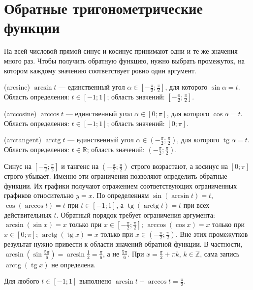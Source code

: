 \section{Обратные тригонометрические функции}
На всей числовой прямой синус и косинус принимают одни и те же значения много раз. Чтобы получить обратную функцию, нужно выбрать промежуток, на котором каждому значению соответствует ровно один аргумент.
\begin{definition} (arcsine) \(\arcsin t\) — единственный угол \(\alpha\in[-\frac\pi2;\frac\pi2]\), для которого \(\sin\alpha=t\). Область определения: \(t\in[-1;1]\); область значений: \([-\frac\pi2;\frac\pi2]\).\end{definition}
\begin{definition} (arccosine) \(\arccos t\) — единственный угол \(\alpha\in[0;\pi]\), для которого \(\cos\alpha=t\). Область определения: \(t\in[-1;1]\); область значений: \([0;\pi]\).\end{definition}
\begin{definition} (arctangent) \(\operatorname{arctg} t\) — единственный угол \(\alpha\in(-\frac\pi2;\frac\pi2)\), для которого \(\operatorname{tg}\alpha=t\). Область определения: \(t\in\mathbb R\); область значений: \((-\frac\pi2;\frac\pi2)\).\end{definition}
Синус на \([-\frac\pi2;\frac\pi2]\) и тангенс на \((-\frac\pi2;\frac\pi2)\) строго возрастают, а косинус на \([0;\pi]\) строго убывает. Именно эти ограничения позволяют определить обратные функции. Их графики получают отражением соответствующих ограниченных графиков относительно \(y=x\).
По определениям \(\sin(\arcsin t)=t\), \(\cos(\arccos t)=t\) при \(t\in[-1;1]\), а \(\operatorname{tg}(\operatorname{arctg} t)=t\) при всех действительных \(t\). Обратный порядок требует ограничения аргумента: \(\arcsin(\sin x)=x\) только при \(x\in[-\frac\pi2;\frac\pi2]\); \(\arccos(\cos x)=x\) только при \(x\in[0;\pi]\); \(\operatorname{arctg}(\operatorname{tg} x)=x\) только при \(x\in(-\frac\pi2;\frac\pi2)\). Вне этих промежутков результат нужно привести к области значений обратной функции. В частности, \(\arcsin(\sin\frac{5\pi}6)=\arcsin\frac12=\frac\pi6\), а не \(\frac{5\pi}6\). При \(x=\frac\pi2+\pi k\), \(k\in\mathbb Z\), сама запись \(\operatorname{arctg}(\operatorname{tg} x)\) не определена.
\begin{theorem}\label{thm:legacy-c15-1}
Для любого \(t\in[-1;1]\) выполнено \(\arcsin t+\arccos t=\frac\pi2\).
\end{theorem}
